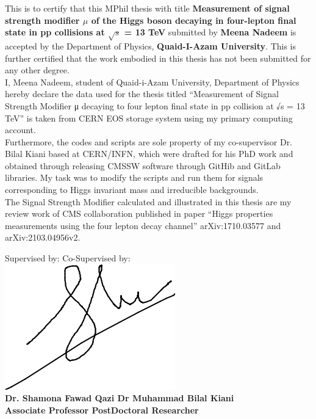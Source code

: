 \begin{center}

                \begin{minipage}{400pt}
              
                        This is to certify that this MPhil thesis with title \textbf{Measurement of signal strength modifier $\mu$ of the Higgs boson decaying in four-lepton final state in pp collisions at $\sqrt{s}$ = 13 TeV} submitted by  \textbf{Meena Nadeem} is accepted by the Department of Physics, \textbf{Quaid-I-Azam University}. This is further certified that the work embodied in this thesis has not been submitted for any other degree.\\
                        I, Meena Nadeem, student of Quaid-i-Azam University, Department of Physics hereby declare the data used for the thesis titled “Measurement of Signal Strength Modifier μ decaying to four lepton final state in pp collision at √s = 13 TeV” is taken from CERN EOS storage system using my primary computing account.\\
Furthermore, the codes and scripts are sole property of my co-supervisor Dr. Bilal Kiani based at CERN/INFN, which were drafted for his PhD work and obtained through releasing CMSSW software through GitHib and GitLab libraries. My task was to modify the scripts and run them for signals corresponding to Higgs invariant mass and irreducible backgrounds. \\
The Signal Strength Modifier calculated and illustrated in this thesis are my review work of CMS collaboration published in paper “Higgs properties measurements using the four lepton decay channel” arXiv:1710.03577 and arXiv:2103.04956v2.\\



                \end{minipage}
        \end{center}

        \bigskip

     
\bigskip
      \begin{flushleft}
              Supervised by:  \hfill  Co-Supervised by:  \\
                
                 \includegraphics[scale=0.3]{images/shamona.jpg} \hfill \\
                \bf Dr. Shamona Fawad Qazi   \hfill \bf Dr Muhammad Bilal Kiani\\
                Associate Professor  \hfill PostDoctoral Researcher\\
        \end{flushleft}

        \bigskip


        
    
\thispagestyle{empty}